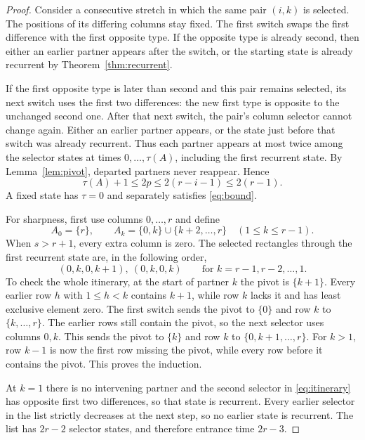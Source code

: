 \documentclass[a4paper,10pt]{amsart}
\theoremstyle{remark}
\begin{document}
\begin{proof}
Consider a consecutive stretch in which the same pair $(i,k)$ is
selected. The positions of its differing columns stay fixed. The first
switch swaps the first difference with the first opposite type. If the
opposite type is already second, then either an earlier partner appears
after the switch, or the starting state is already recurrent by
Theorem~\ref{thm:recurrent}.

If the first opposite type is later than second and this pair remains
selected, its next switch uses the first two differences: the new first
type is opposite to the unchanged second one. After that next switch,
the pair's column selector cannot change again. Either an earlier
partner appears, or the state just before that switch was already
recurrent. Thus each partner appears at most twice among the selector
states at times $0,\ldots,\tau(A)$, including the first recurrent state.
By Lemma~\ref{lem:pivot}, departed partners never reappear. Hence
\[
 \tau(A)+1\le2p\le2(r-i-1)\le2(r-1).
\]
A fixed state has $\tau=0$ and separately satisfies \eqref{eq:bound}.

For sharpness, first use columns $0,\ldots,r$ and define
\begin{equation}\label{eq:witness}
 A_0=\{r\},\qquad
 A_k=\{0,k\}\cup\{k+2,\ldots,r\}
 \quad(1\le k\le r-1).
\end{equation}
When $s>r+1$, every extra column is zero. The selected rectangles
through the first recurrent state are, in the following order,
\begin{equation}\label{eq:itinerary}
 (0,k,0,k+1),\ (0,k,0,k)
 \qquad\text{for }k=r-1,r-2,\ldots,1.
\end{equation}
To check the whole itinerary, at the start of partner $k$ the pivot
is $\{k+1\}$. Every earlier row $h$ with $1\le h<k$ contains $k+1$,
while row $k$ lacks it and has least exclusive element zero. The first
switch sends the pivot to $\{0\}$ and row $k$ to $\{k,\ldots,r\}$.
The earlier rows still contain the pivot, so the next selector uses
columns $0,k$. This sends the pivot to $\{k\}$ and row $k$ to
$\{0,k+1,\ldots,r\}$. For $k>1$, row $k-1$ is now the first row
missing the pivot, while every row before it contains the pivot.
This proves the induction.

At $k=1$ there is no intervening partner and the second selector in
\eqref{eq:itinerary} has opposite first two differences, so that state
is recurrent. Every earlier selector in the list strictly decreases
at the next step, so no earlier state is recurrent. The list has
$2r-2$ selector states, and therefore entrance time $2r-3$.
\end{proof}
\end{document}
